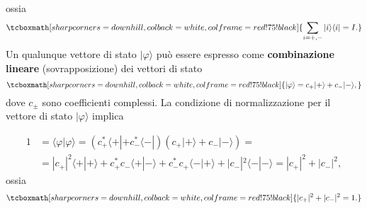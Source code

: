 \documentclass[a4paper,12pt,oneside]{book}
\begin{document}
ossia
	\begin{equation}
		\tcboxmath[sharp corners=downhill ,colback=white,colframe=red!75!black]{
			\sum \limits_{i=+,-} | i \rangle \langle i | = I .
			}
	\end{equation}
Un qualunque vettore di stato $| \varphi \rangle $ può essere espresso come \textbf{combinazione lineare} (sovrapposizione) dei vettori di stato
	\begin{equation}
		\tcboxmath[sharp corners=downhill ,colback=white,colframe=red!75!black]{
			| \varphi \rangle = c_+ | + \rangle + c_- | - \rangle ,
			}
	\end{equation}
dove $c_{\pm}$ sono coefficienti complessi. La condizione di normalizzazione per il vettore di stato $ | \varphi \rangle $ implica

	\begin{equation}
		\begin{aligned}
			1 & =\langle \varphi | \varphi \rangle = (c^*_+\langle + | +c^*_- \langle - |)(c_+| + \rangle +c_- | - \rangle)=\\
			&=| c_+|^2\langle + | + \rangle +c^*_+c_- \langle + | - \rangle +c^*_-c_+ \langle - | + \rangle +|c_-|^2 \langle - | - \rangle =|c_+|^2+|c_-|^2 ,
				\end{aligned} 
	\end{equation}
ossia 
	\begin{equation}
		\tcboxmath[sharp corners=downhill ,colback=white,colframe=red!75!black]{
			|c_+|^2+|c_-|^2=1 .
			}
	\end{equation}
\end{document}
